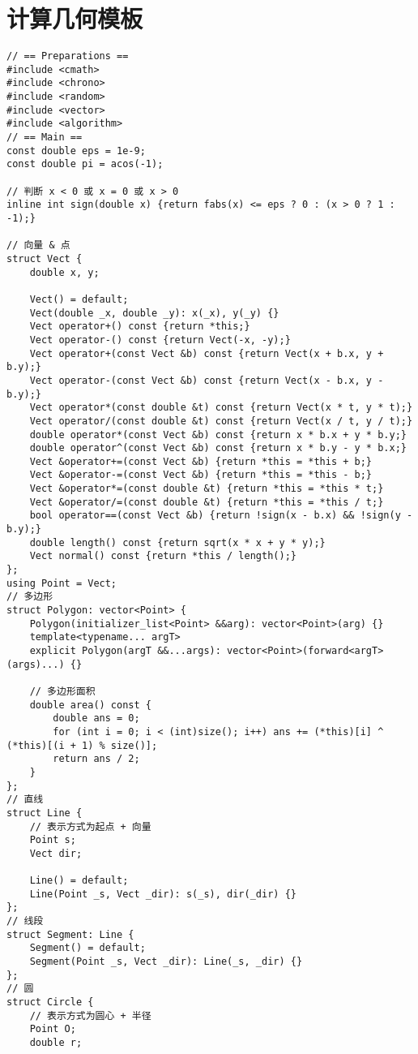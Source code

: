 \section{计算几何模板}

\begin{verbatim}
// == Preparations ==
#include <cmath>
#include <chrono>
#include <random>
#include <vector>
#include <algorithm>
// == Main ==
const double eps = 1e-9;
const double pi = acos(-1);

// 判断 x < 0 或 x = 0 或 x > 0
inline int sign(double x) {return fabs(x) <= eps ? 0 : (x > 0 ? 1 : -1);}

// 向量 & 点
struct Vect {
    double x, y;

    Vect() = default;
    Vect(double _x, double _y): x(_x), y(_y) {}
    Vect operator+() const {return *this;}
    Vect operator-() const {return Vect(-x, -y);}
    Vect operator+(const Vect &b) const {return Vect(x + b.x, y + b.y);}
    Vect operator-(const Vect &b) const {return Vect(x - b.x, y - b.y);}
    Vect operator*(const double &t) const {return Vect(x * t, y * t);}
    Vect operator/(const double &t) const {return Vect(x / t, y / t);}
    double operator*(const Vect &b) const {return x * b.x + y * b.y;}
    double operator^(const Vect &b) const {return x * b.y - y * b.x;}
    Vect &operator+=(const Vect &b) {return *this = *this + b;}
    Vect &operator-=(const Vect &b) {return *this = *this - b;}
    Vect &operator*=(const double &t) {return *this = *this * t;}
    Vect &operator/=(const double &t) {return *this = *this / t;}
    bool operator==(const Vect &b) {return !sign(x - b.x) && !sign(y - b.y);}
    double length() const {return sqrt(x * x + y * y);}
    Vect normal() const {return *this / length();}
};
using Point = Vect;
// 多边形
struct Polygon: vector<Point> {
    Polygon(initializer_list<Point> &&arg): vector<Point>(arg) {}
    template<typename... argT>
    explicit Polygon(argT &&...args): vector<Point>(forward<argT>(args)...) {}

    // 多边形面积
    double area() const {
        double ans = 0;
        for (int i = 0; i < (int)size(); i++) ans += (*this)[i] ^ (*this)[(i + 1) % size()];
        return ans / 2;
    }
};
// 直线
struct Line {
    // 表示方式为起点 + 向量
    Point s;
    Vect dir;

    Line() = default;
    Line(Point _s, Vect _dir): s(_s), dir(_dir) {}
};
// 线段
struct Segment: Line {
    Segment() = default;
    Segment(Point _s, Vect _dir): Line(_s, _dir) {}
};
// 圆
struct Circle {
    // 表示方式为圆心 + 半径
    Point O;
    double r;


\end{verbatim}
